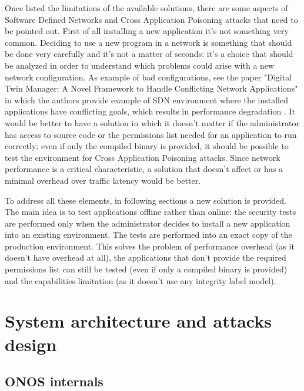 \documentclass[a4paper,10pt]{memoir}
\begin{document}
Once listed the limitations of the available solutions, there are some aspects of Software Defined Networks and Cross Application Poisoning attacks that need to be pointed out. First of all installing a new application it's not something very common. Deciding to use a new program in a network is something that should be done very carefully and it's not a matter of seconds: it's a choice that should be analyzed in order to understand which problems could arise with a new network configuration. As example of bad configurations, see the paper "Digital Twin Manager: A Novel Framework to
Handle Conflicting Network Applications" in which the authors provide example of SDN environment where the installed applications have conflicting goals, which results in performance degradation \cite{dt-manager}. It would be better to have a solution in which it doesn't matter if the administrator has access to source code or the permissions list needed for an application to run correctly; even if only the compiled binary is provided, it should be possible to test the environment for Cross Application Poisoning attacks. Since network performance is a critical characteristic, a solution that doesn't affect or has a minimal overhead over traffic latency would be better.
\medskip

To address all these elements, in following sections a new solution is provided. The main idea is to test applications offline rather than online: the security tests are performed only when the administrator decides to install a new application into an existing environment. The tests are performed into an exact copy of the production environment. This solves the problem of performance overhead (as it doesn't have overhead at all), the applications that don't provide the required permissions list can still be tested (even if only a compiled binary is provided) and the capabilities limitation (as it doesn't use any integrity label model).

\clearpage

\chapter{System architecture and attacks design}

\section{ONOS internals}
\end{document}
